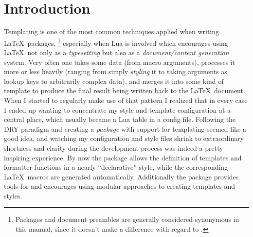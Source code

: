 \documentclass[12pt]{scrartcl}
\title{\luatemplates}
\subtitle{v0.8}
\author{Urs Liska}
\date{\today}
\begin{document}
\maketitle

\begin{abstract}

\luatemplates\ is a package for Lua\LaTeX\ designed to assist package
and document authors with the recurring task of \emph{templating}.  It
substantially reduces the complexity of interfacing the \LaTeX\ and the Lua
domains, making it simpler to approach the development of document preambles and
packages purely in Lua.  At the same time it assists with and encourages a
modular style of programming templates and styles.

\end{abstract}


\tableofcontents

\section{Introduction}

\let\oldsection\section
\renewcommand\section{\newpage\oldsection}

Templating is one of the most common techniques applied when writing \LaTeX\
packages,%
\footnote{Packages and document preambles are generally considered synonymous in this manual, since it doesn't make a difference with regard to \luatemplates.} %
especially when Lua is involved which encourages using \LaTeX\ not
only as a \emph{typesetting} but also as a \emph{document/content generation}
system.  Very often one takes some data (from macro arguments), processes it
more or less heavily (ranging from simply \emph{styling} it to taking arguments
as lookup keys to arbitrarily complex data), and merges it into some kind of
template to produce the final result being written back to the \LaTeX\ document.
When I started to regularly make use of that pattern I realized that in every
case I ended up wanting to concentrate my style and template configuration at a
central place, which usually became a Lua table in a config file.  Following the
DRY paradigm and creating a \emph{package} with support for templating seemed
like a good idea, and watching my configuration and style files shrink to
extraordinary shortness and clarity during the development process was indeed a
pretty inspiring experience.  By now the package allows the definition of
templates and formatter functions in a nearly “declarative” style, while the
corresponding \LaTeX\ macros are generated automatically. Additionally the
package provides tools for and encourages using modular approaches to creating
templates and styles.
\end{document}
